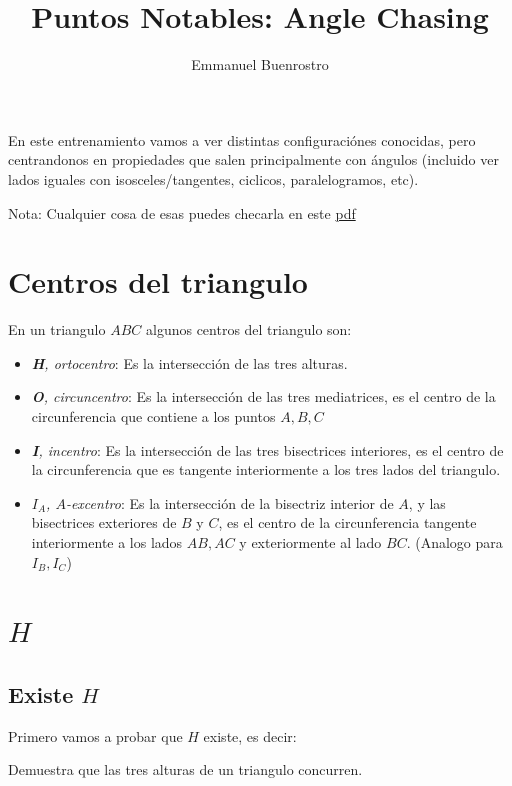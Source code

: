 \documentclass[11pt]{scrartcl}
\title {Puntos Notables: Angle Chasing}
\author{Emmanuel Buenrostro}
\begin{document}
\maketitle

En este entrenamiento vamos a ver distintas configuraci\'ones conocidas, pero centrandonos en propiedades que salen principalmente con \'angulos (incluido ver lados iguales con isosceles/tangentes, ciclicos, paralelogramos, etc).
 
Nota: Cualquier cosa de esas puedes checarla en este \href{https://sopaconk.github.io/PONTEAENTRENAR/Mis_propias_listas/OMMJAL-FEM/Angle%20Chasing/Angle_Chasing.pdf}{pdf}
\section{Centros del triangulo}
En un triangulo $ABC$ algunos centros del triangulo son:
\begin{itemize}

    \item \textit{\textbf{H}, ortocentro}: Es la intersecci\'on de las tres alturas.

    \item \textit{\textbf{O}, circuncentro}: Es la intersecci\'on de las tres mediatrices, es el centro de la circunferencia que contiene a los puntos $A,B,C$

    \item \textit{\textbf{I}, incentro}: Es la intersecci\'on de las tres bisectrices interiores, es el centro de la circunferencia que es tangente interiormente a los tres lados del triangulo.
    
    \item \textit{\textbf{$I_A$}, $A$-excentro}: Es la intersecci\'on de la bisectriz interior de $A$, y las bisectrices exteriores de $B$ y $C$, es el centro de la circunferencia tangente interiormente a los lados $AB,AC$ y exteriormente al lado $BC$. (Analogo para \textit{\textbf{$I_B, I_C$}})

\end{itemize}



\section{$H$}

\subsection{Existe $H$}
Primero vamos a probar que $H$ existe, es decir:
\begin{exercise} [$H$ existe]
Demuestra que las tres alturas de un triangulo concurren.
\end{exercise}
\end{document}
